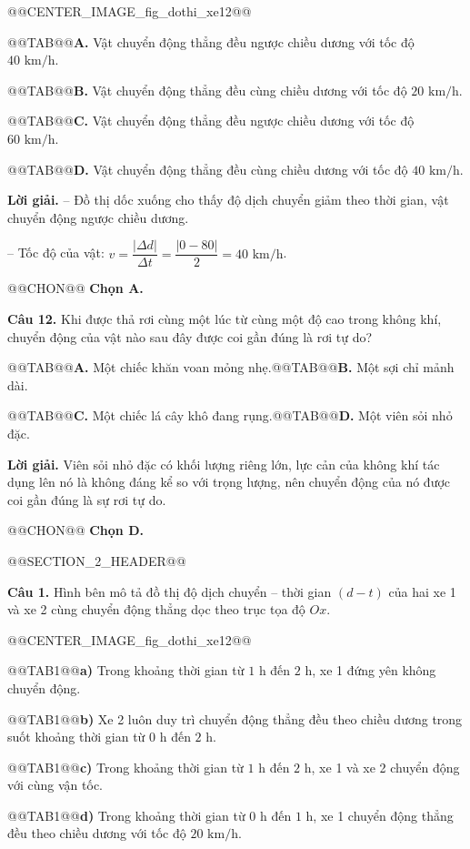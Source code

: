 \documentclass{article}
\begin{document}
@@CENTER_IMAGE_fig_dothi_xe12@@

@@TAB@@\textbf{A.} Vật chuyển động thẳng đều ngược chiều dương với tốc độ $40\text{ km/h}$.

@@TAB@@\textbf{B.} Vật chuyển động thẳng đều cùng chiều dương với tốc độ $20\text{ km/h}$.

@@TAB@@\textbf{C.} Vật chuyển động thẳng đều ngược chiều dương với tốc độ $60\text{ km/h}$.

@@TAB@@\textbf{D.} Vật chuyển động thẳng đều cùng chiều dương với tốc độ $40\text{ km/h}$.

\textbf{Lời giải.} -- Đồ thị dốc xuống cho thấy độ dịch chuyển giảm theo thời gian, vật chuyển động ngược chiều dương.

-- Tốc độ của vật: $v = \dfrac{|\Delta d|}{\Delta t} = \dfrac{|0 - 80|}{2} = 40\text{ km/h}$.

@@CHON@@ \textbf{Chọn A.}

\textbf{Câu 12.} Khi được thả rơi cùng một lúc từ cùng một độ cao trong không khí, chuyển động của vật nào sau đây được coi gần đúng là rơi tự do?

@@TAB@@\textbf{A.} Một chiếc khăn voan mỏng nhẹ.@@TAB@@\textbf{B.} Một sợi chỉ mảnh dài.

@@TAB@@\textbf{C.} Một chiếc lá cây khô đang rụng.@@TAB@@\textbf{D.} Một viên sỏi nhỏ đặc.

\textbf{Lời giải.} Viên sỏi nhỏ đặc có khối lượng riêng lớn, lực cản của không khí tác dụng lên nó là không đáng kể so với trọng lượng, nên chuyển động của nó được coi gần đúng là sự rơi tự do.

@@CHON@@ \textbf{Chọn D.}

@@SECTION_2_HEADER@@

\textbf{Câu 1.} Hình bên mô tả đồ thị độ dịch chuyển -- thời gian $(d - t)$ của hai xe 1 và xe 2 cùng chuyển động thẳng dọc theo trục tọa độ $Ox$.

@@CENTER_IMAGE_fig_dothi_xe12@@

@@TAB1@@\textbf{a)} Trong khoảng thời gian từ $1\text{ h}$ đến $2\text{ h}$, xe 1 đứng yên không chuyển động.

@@TAB1@@\textbf{b)} Xe 2 luôn duy trì chuyển động thẳng đều theo chiều dương trong suốt khoảng thời gian từ $0\text{ h}$ đến $2\text{ h}$.

@@TAB1@@\textbf{c)} Trong khoảng thời gian từ $1\text{ h}$ đến $2\text{ h}$, xe 1 và xe 2 chuyển động với cùng vận tốc.

@@TAB1@@\textbf{d)} Trong khoảng thời gian từ $0\text{ h}$ đến $1\text{ h}$, xe 1 chuyển động thẳng đều theo chiều dương với tốc độ $20\text{ km/h}$.
\end{document}
